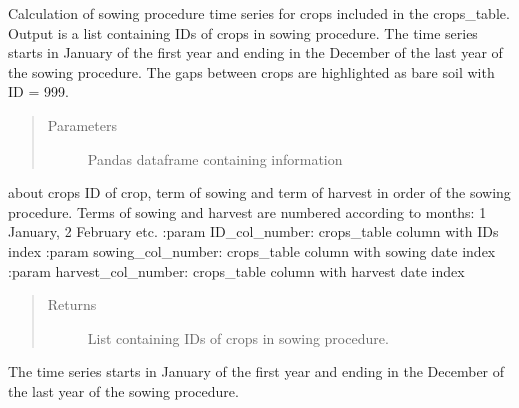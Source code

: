 \documentclass[letterpaper,10pt,english]{sphinxmanual}
\begin{document}
\begin{fulllineitems}
\begin{fulllineitems}
\end{fulllineitems}


\begin{fulllineitems}
\label{\detokenize{libs:sowing_proc.SowingProcTimeSeries.calcSowingProc}}
Calculation of sowing procedure time series for crops
included in the crops\_table. Output is a list containing IDs
of crops in sowing procedure.
The time series starts in January of the first year and
ending in the December of the last year of the sowing
procedure. The gaps between crops are highlighted as bare
soil with ID = 999.
\begin{quote}\begin{description}
\item[{Parameters}] \leavevmode
{} \textendash{} Pandas dataframe containing information

\end{description}\end{quote}

about crops \sphinxhyphen{} ID of crop, term of sowing and term of harvest
in order of the sowing procedure. Terms of sowing and harvest
are numbered according to months: 1 \sphinxhyphen{} January, 2 \sphinxhyphen{} February etc.
:param ID\_col\_number: crops\_table column with IDs index
:param sowing\_col\_number: crops\_table column with sowing date
index
:param harvest\_col\_number: crops\_table column with harvest date
index
\begin{quote}\begin{description}
\item[{Returns}] \leavevmode
List containing IDs of crops in sowing procedure.

\end{description}\end{quote}

The time series starts in January of the first year and
ending in the December of the last year of the sowing
procedure.


\end{fulllineitems}
\end{fulllineitems}
\end{document}
